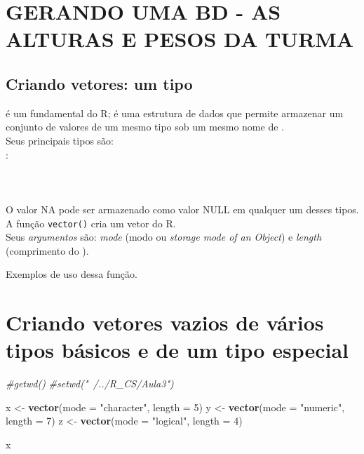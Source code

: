 \documentclass[]{article}
\newenvironment{Shaded}{\begin{snugshade}}{\end{snugshade}}
\newcommand{\KeywordTok}[1]{\textcolor[rgb]{0.13,0.29,0.53}{\textbf{#1}}}
\newcommand{\DataTypeTok}[1]{\textcolor[rgb]{0.13,0.29,0.53}{#1}}
\newcommand{\DecValTok}[1]{\textcolor[rgb]{0.00,0.00,0.81}{#1}}
\newcommand{\StringTok}[1]{\textcolor[rgb]{0.31,0.60,0.02}{#1}}
\newcommand{\CommentTok}[1]{\textcolor[rgb]{0.56,0.35,0.01}{\textit{#1}}}
\newcommand{\NormalTok}[1]{#1}
\begin{document}
\section{GERANDO UMA BD - AS ALTURAS E PESOS DA
TURMA}\label{gerando-uma-bd---as-alturas-e-pesos-da-turma}

\subsection{\texorpdfstring{Criando vetores: um tipo
}{Criando vetores: um  tipo }}\label{criando-vetores-um-tipo}

 é um fundamental do R; é uma estrutura de dados que permite armazenar
um conjunto de valores de um mesmo tipo sob um mesmo nome de .\\
Seus principais tipos são:\\
: \\
\\
\\
\\
O valor NA pode ser armazenado como valor NULL em qualquer um desses
tipos. A função \texttt{vector()} cria um vetor do R.\\
Seus \emph{argumentos} são: \emph{mode} (modo ou \emph{storage mode of
an Object}) e \emph{length} (comprimento do ).

Exemplos de uso dessa função.

\section{Criando vetores vazios de vários tipos básicos e de um tipo
especial}\label{criando-vetores-vazios-de-varios-tipos-basicos-e-de-um-tipo-especial}

\begin{Shaded}
\begin{Highlighting}[]
\CommentTok{#getwd()}
\CommentTok{#setwd("~/../R_CS/Aula3")}

\NormalTok{x <-}\StringTok{ }\KeywordTok{vector}\NormalTok{(}\DataTypeTok{mode =} \StringTok{"character"}\NormalTok{, }\DataTypeTok{length =} \DecValTok{5}\NormalTok{)}
\NormalTok{y <-}\StringTok{ }\KeywordTok{vector}\NormalTok{(}\DataTypeTok{mode =} \StringTok{"numeric"}\NormalTok{, }\DataTypeTok{length =} \DecValTok{7}\NormalTok{)}
\NormalTok{z <-}\StringTok{ }\KeywordTok{vector}\NormalTok{(}\DataTypeTok{mode =} \StringTok{"logical"}\NormalTok{, }\DataTypeTok{length =} \DecValTok{4}\NormalTok{)}

\NormalTok{x}
\end{Highlighting}
\end{Shaded}
\end{document}
